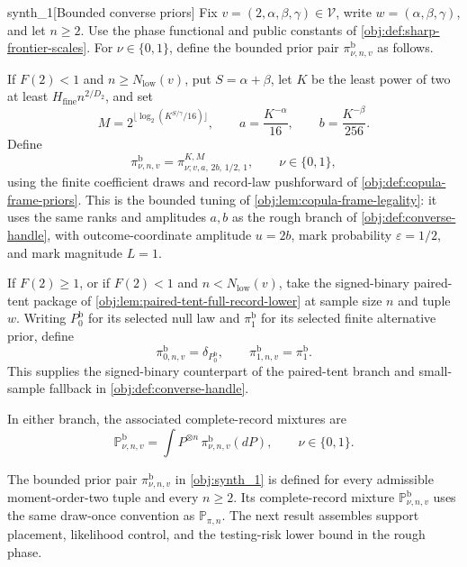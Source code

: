 \begin{definitionv}{synth_1}[Bounded converse priors]
Fix \(v=(2,\alpha,\beta,\gamma)\in\mathcal V\), write \(w=(\alpha,\beta,\gamma)\), and let \(n\ge2\). Use the phase functional and public constants of \cref{obj:def:sharp-frontier-scales}. For \(\nu\in\{0,1\}\), define the bounded prior pair \(\pi^{\mathrm b}_{\nu,n,v}\) as follows.

If \(F(2)<1\) and \(n\ge N_{\mathrm{low}}(v)\), put \(S=\alpha+\beta\), let \(K\) be the least power of two at least \(H_{\mathrm{fine}}n^{2/D_2}\), and set
\[
 M=2^{\lfloor\log_2(K^{S/\gamma}/16)\rfloor},
 \qquad a=\frac{K^{-\alpha}}{16},
 \qquad b=\frac{K^{-\beta}}{256}.
\]
Define
\[
 \pi^{\mathrm b}_{\nu,n,v}
   =\pi^{K,M}_{\nu;v,a,\,2b,\,1/2,\,1},
 \qquad \nu\in\{0,1\},
\]
using the finite coefficient draws and record-law pushforward of \cref{obj:def:copula-frame-priors}. This is the bounded tuning of \cref{obj:lem:copula-frame-legality}: it uses the same ranks and amplitudes \(a,b\) as the rough branch of \cref{obj:def:converse-handle}, with outcome-coordinate amplitude \(u=2b\), mark probability \(\varepsilon=1/2\), and mark magnitude \(L=1\).

If \(F(2)\ge1\), or if \(F(2)<1\) and \(n<N_{\mathrm{low}}(v)\), take the signed-binary paired-tent package of \cref{obj:lem:paired-tent-full-record-lower} at sample size \(n\) and tuple \(w\). Writing \(P_0^{\mathrm b}\) for its selected null law and \(\pi_1^{\mathrm b}\) for its selected finite alternative prior, define
\[
 \pi^{\mathrm b}_{0,n,v}=\delta_{P_0^{\mathrm b}},
 \qquad
 \pi^{\mathrm b}_{1,n,v}=\pi_1^{\mathrm b}.
\]
This supplies the signed-binary counterpart of the paired-tent branch and small-sample fallback in \cref{obj:def:converse-handle}.

In either branch, the associated complete-record mixtures are
\[
 \mathbb P^{\mathrm b}_{\nu,n,v}
   =\int P^{\otimes n}\,\pi^{\mathrm b}_{\nu,n,v}(dP),
 \qquad \nu\in\{0,1\}.
\]
\end{definitionv}

The bounded prior pair \(\pi^{\mathrm b}_{\nu,n,v}\) in \cref{obj:synth_1} is defined for every admissible moment-order-two tuple and every \(n\ge2\). Its complete-record mixture \(\mathbb P^{\mathrm b}_{\nu,n,v}\) uses the same draw-once convention as \(\mathbb P_{\pi,n}\). The next result assembles support placement, likelihood control, and the testing-risk lower bound in the rough phase.

